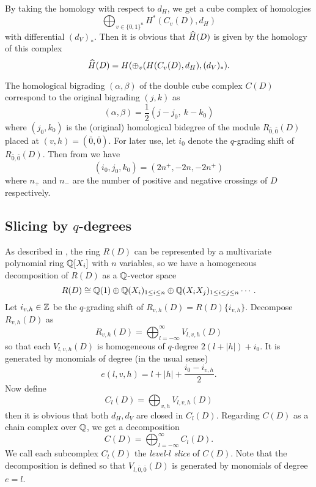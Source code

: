 By taking the homology with respect to $d_H$, we get a cube complex of homologies
\[
    \bigoplus_{v \in \{0, 1\}^n} H^*(C_v(D), d_H)
\]
with differential $(d_V)_*$. Then it is obvious that $\widehat{H}(D)$ is given by the homology of this complex
\[
    \widehat{H}(D) = H(\oplus_v (H(C_v(D), d_H), (d_V)_*).
\]

The homological bigrading $(\alpha, \beta)$ of the double cube complex $C(D)$ correspond to the original bigrading $(j, k)$ as
\[
    (\alpha, \beta) = \frac{1}{2}(j - j_0,\ k - k_0)
\]
where $(j_0, k_0)$ is the (original) homological bidegree of the module $R_{\bar{0}, \bar{0}}(D)$ placed at $(v, h) = (\bar{0}, \bar{0})$. For later use, let $i_0$ denote the $q$-grading shift of $R_{\bar{0}, \bar{0}}(D)$. Then from  we have 
%
\begin{equation} \label{eq:ijk0}
    (i_0, j_0, k_0) = (2n^+, -2n, -2n^+)
\end{equation}
%
where $n_+$ and $n_-$ are the number of positive and negative crossings of $D$ respectively.

\subsection{Slicing by $q$-degrees} 

As described in , the ring $R(D)$ can be represented by a multivariate polynomial ring $\mathbb{Q}[X_i]$ with $n$ variables, so we have a homogeneous decomposition of $R(D)$ as a $\mathbb{Q}$-vector space
\[
    R(D) \cong \mathbb{Q}(1) \oplus \mathbb{Q}(X_i)_{1 \leq i \leq n}  \oplus \mathbb{Q}(X_i X_j)_{1 \leq i \leq j \leq n} \cdots.
\]
Let $i_{v, h} \in \mathbb{Z}$ be the $q$-grading shift of $R_{v, h}(D) = R(D)\{i_{v, h}\}$. Decompose $R_{v, h}(D)$ as 
\[
    R_{v, h}(D) = \bigoplus_{l = -\infty}^\infty V_{l, v, h}(D)
\]
so that each $V_{l, v, h}(D)$ is homogeneous of $q$-degree $2(l + |h|) + i_0$. It is generated by monomials 
of degree (in the usual sense) 
%
\begin{equation} \label{eq:monomial-degree}
    e(l, v, h) = l + |h| + \frac{i_0 - i_{v, h}}{2}.
\end{equation}
%
Now define 
\[
    C_l(D) = \bigoplus_{v, h} V_{l, v, h}(D)
\]
then it is obvious that both $d_H, d_V$ are closed in $C_l(D)$.  Regarding $C(D)$ as a chain complex over $\mathbb{Q}$, we get a decomposition
\[
    C(D) = \bigoplus_{l = -\infty}^\infty C_l(D).
\]
We call each subcomplex $C_l(D)$ the \textit{level-$l$ slice} of $C(D)$. Note that the decomposition is defined so that $V_{l, \bar{0}, \bar{0}}(D)$ is generated by monomials of degree $e = l$. 

